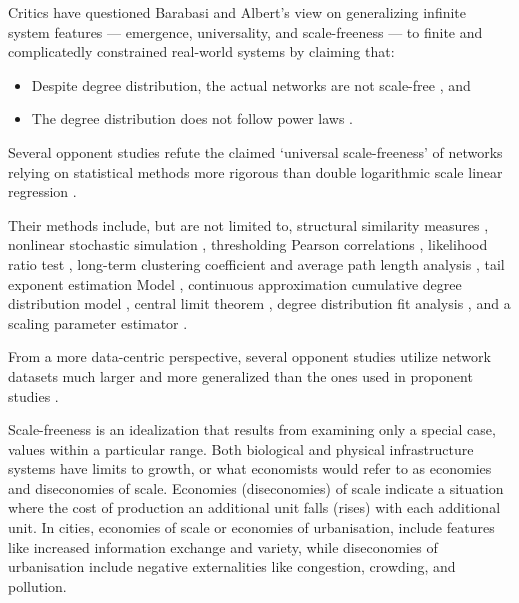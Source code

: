 \documentclass{article}[12pt]
\begin{document}
Critics have questioned Barabasi and Albert’s view on generalizing infinite system features — emergence, universality, and scale-freeness — to finite and complicatedly constrained real-world systems \citep{holme2019rare}  by claiming that: 
\begin{itemize}
    \item  Despite degree distribution, the actual networks are not scale-free \citep{newman2003structure,stumpf2005subnets,tanaka2005scale,ko2008rethinking,guo2010s} , 
and 
    \item The degree distribution does not follow power laws \citep{dorogovtsev2000generic,jones2003sexual,clauset2009power,lima2009powerful,prvzulj2007biological,golosovsky2017power,broido2019scale,voitalov2019scale,hartmann2021searching,smith2021scarcity}.
\end{itemize}
    
Several opponent studies refute the claimed `universal scale-freeness' of networks relying on statistical methods more rigorous than double logarithmic scale linear regression \citep{jones2003sexual,dorogovtsev2000generic,li2005towards,tanaka2005scale,khanin2006scale,jackson2007meeting,clauset2009power,lima2009powerful,prvzulj2007biological,willinger2009mathematics,stumpf2012critical,golosovsky2017power,broido2019scale,voitalov2019scale,hartmann2021searching,smith2021scarcity}. 

Their methods include, but are not limited to, structural similarity measures \citep{prvzulj2007biological}, nonlinear stochastic simulation \citep{golosovsky2017power}, thresholding Pearson correlations \citep{khanin2006scale}, likelihood ratio test \citep{broido2019scale}, long-term clustering coefficient and average path length analysis \citep{hartmann2021searching}, tail exponent estimation Model \citep{voitalov2019scale}, continuous approximation cumulative degree distribution model \citep{golosovsky2017power}, central limit theorem \citep{stumpf2005sampling}, degree distribution fit analysis \citep{dorogovtsev2000generic,stumpf2005subnets,tanaka2005scale,lima2009powerful}, and a scaling parameter estimator \citep{jones2003sexual,clauset2009power}.

From a more data-centric perspective, several opponent studies utilize network datasets much larger and more generalized than the ones used in proponent studies \citep{newman2003structure,clauset2009power,prvzulj2007biological,broido2019scale,smith2021scarcity}. 

Scale-freeness is an idealization that results from examining only a special case, values within a particular range. Both biological and physical infrastructure systems have limits to growth, or what economists would refer to as economies and diseconomies of scale. Economies (diseconomies) of scale indicate a situation where the cost of production an additional unit falls (rises) with each additional unit. 
In cities, economies of scale or economies of urbanisation, include features like increased information exchange and variety, while diseconomies of urbanisation include negative externalities like congestion, crowding,  and pollution. 
\end{document}
